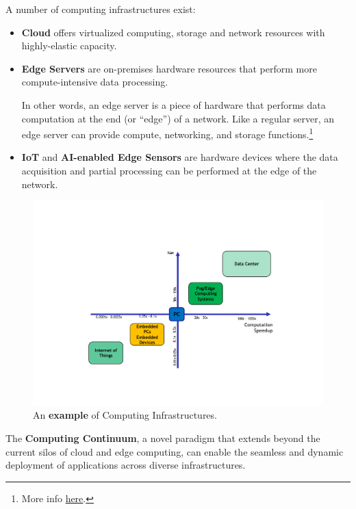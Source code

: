 \documentclass[a4paper]{article}
\newcommand{\dquotes}[1]{``#1''}
\newcommand{\definition}[1]{\textcolor{Red3}{\textbf{#1}}\index{#1}}
\newcommand{\example}[1]{\textcolor{Green4}{\textbf{#1}}}
\begin{document}
    \noindent
    A number of computing infrastructures exist:
    \begin{itemize}
        \item \textbf{Cloud} offers virtualized computing, storage and network resources with highly-elastic capacity.
        
        
        \item \textbf{Edge Servers} are on-premises hardware resources that perform more compute-intensive data processing.
        
        In other words, an edge server is a piece of hardware that performs data computation at the end (or \dquotes{edge}) of a network. Like a regular server, an edge server can provide compute, networking, and storage functions.\footnote{More info \href{https://phoenixnap.com/blog/edge-server}{here}.}

        
        \item \textbf{IoT} and \textbf{AI-enabled Edge Sensors} are hardware devices where the data acquisition and partial processing can be performed at the edge of the network.
    \end{itemize}

    \begin{figure}[!htp]
        \centering
        \includegraphics[width=\textwidth]{img/example-computing-infrastructure-1.pdf}
        \caption{An \example{example} of Computing Infrastructures.\cite{computing-infrastructures-slides}}
    \end{figure}

    \noindent
    The \definition{Computing Continuum}, a novel paradigm that extends beyond the current silos of cloud and edge computing, can enable the seamless and dynamic deployment of applications across diverse infrastructures.\cite{marino2023computing}
\end{document}
